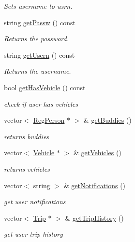\begin{DoxyCompactItemize}
\begin{DoxyCompactList}\small\item\em Sets username to usrn. \end{DoxyCompactList}\item 
string \hyperlink{class_reg_person_a3b2b617680af61b9af7fac6a4d2a69fb}{get\+Passw} () const 
\begin{DoxyCompactList}\small\item\em Returns the password. \end{DoxyCompactList}\item 
string \hyperlink{class_reg_person_ab2ea80db160779902c00c65e07249d18}{get\+Usern} () const 
\begin{DoxyCompactList}\small\item\em Returns the username. \end{DoxyCompactList}\item 
bool \hyperlink{class_reg_person_ae1c37bdaecf7775c657680e10d5819cc}{get\+Has\+Vehicle} () const 
\begin{DoxyCompactList}\small\item\em check if user has vehicles \end{DoxyCompactList}\item 
vector$<$ \hyperlink{class_reg_person}{Reg\+Person} $\ast$ $>$ \& \hyperlink{class_reg_person_a498a20eb4a5869a3a4d4266ec76a2356}{get\+Buddies} ()
\begin{DoxyCompactList}\small\item\em returns buddies \end{DoxyCompactList}\item 
vector$<$ \hyperlink{class_vehicle}{Vehicle} $\ast$ $>$ \& \hyperlink{class_reg_person_ae1ef0364b2731ddd51460a3c37054457}{get\+Vehicles} ()
\begin{DoxyCompactList}\small\item\em returns vehicles \end{DoxyCompactList}\item 
vector$<$ string $>$ \& \hyperlink{class_reg_person_a523aef12cf566320a97d19f6dcc15a11}{get\+Notifications} ()
\begin{DoxyCompactList}\small\item\em get user notifications \end{DoxyCompactList}\item 
vector$<$ \hyperlink{class_trip}{Trip} $\ast$ $>$ \& \hyperlink{class_reg_person_a352a761ffdd5f3bd9f0a4c10538789a6}{get\+Trip\+History} ()
\begin{DoxyCompactList}\small\item\em get user trip history \end{DoxyCompactList}\item 

\end{DoxyCompactItemize}
